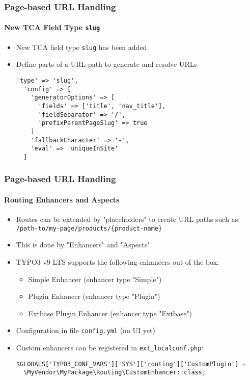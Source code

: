 
\begin{frame}[fragile]
	\frametitle{Page-based URL Handling}
	\framesubtitle{New TCA Field Type \texttt{slug}}

	\lstset{basicstyle=\smaller\ttfamily}

	\begin{itemize}
		\item New TCA field type \texttt{slug} has been added
		\item Define parts of a URL path to generate and resolve URLs

		\begin{lstlisting}
'type' => 'slug',
  'config' => [
    'generatorOptions' => [
      'fields' => ['title', 'nav_title'],
      'fieldSeparator' => '/',
      'prefixParentPageSlug' => true
    ]
    'fallbackCharacter' => '-',
    'eval' => 'uniqueInSite'
  ]
		\end{lstlisting}
	\end{itemize}

\end{frame}


\begin{frame}[fragile]
	\frametitle{Page-based URL Handling}
	\framesubtitle{Routing Enhancers and Aspects}

	\lstset{basicstyle=\smaller\ttfamily}

	\begin{itemize}
		\item Routes can be extended by "placeholders" to create URL paths such as:
			\smaller\texttt{/path-to/my-page/products/\{product-name\}}\normalsize
		\item This is done by "Enhancers" and "Aspects"
		\item TYPO3 v9 LTS supports the following enhancers out of the box:

			\begin{itemize}
				\item Simple Enhancer (enhancer type "Simple")
				\item Plugin Enhancer (enhancer type "Plugin")
				\item Extbase Plugin Enhancer (enhancer type "Extbase")
			\end{itemize}

		\item Configuration in file \texttt{config.yml} (no UI yet)
		\item Custom enhancers can be registered in \texttt{ext\_localconf.php}:

\begin{lstlisting}
$GLOBALS['TYPO3_CONF_VARS']['SYS']['routing']['CustomPlugin'] =
  \MyVendor\MyPackage\Routing\CustomEnhancer::class;
\end{lstlisting}
	\end{itemize}

\end{frame}

